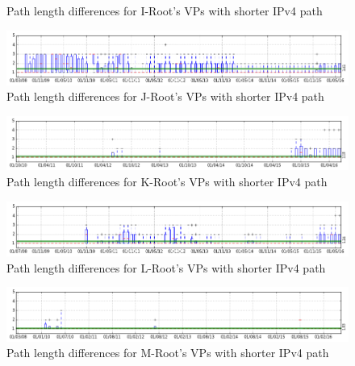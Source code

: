 \begin{appendices}
\begin{figure}[!htb]
		\caption{Path length differences for I-Root's VPs with shorter IPv4 path}
		\label{fig:shorter-ipv4-i}
	\end{figure}
	\begin{figure}[!htb]
		\centering
		\includegraphics[width=6.0in]{img/shorter-ipv4-j.png}
		\caption{Path length differences for J-Root's VPs with shorter IPv4 path}
		\label{fig:shorter-ipv4-j}
	\end{figure}
	\begin{figure}[!htb]
		\centering
		\includegraphics[width=6.0in]{img/shorter-ipv4-k.png}
		\caption{Path length differences for K-Root's VPs with shorter IPv4 path}
		\label{fig:shorter-ipv4-k}
	\end{figure}
	\begin{figure}[!htb]
		\centering
		\includegraphics[width=6.0in]{img/shorter-ipv4-l.png}
		\caption{Path length differences for L-Root's VPs with shorter IPv4 path}
		\label{fig:shorter-ipv4-l}
	\end{figure}
	\begin{figure}[!htb]
		\centering
		\includegraphics[width=6.0in]{img/shorter-ipv4-m.png}
		\caption{Path length differences for M-Root's VPs with shorter IPv4 path}
		\label{fig:shorter-ipv4-m}
	\end{figure}
	

\end{appendices}
